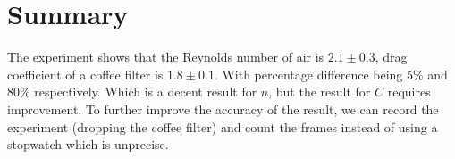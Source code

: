 \documentclass{article}
\begin{document}
\section{Summary}
The experiment shows that the Reynolds number of air is $2.1\pm 0.3$, drag coefficient of a coffee filter is $1.8\pm 0.1$. With percentage difference being 5\% and 80\% respectively. Which is a decent result for $n$, but the result for $C$ requires improvement. To further improve the accuracy of the result, we can record the experiment (dropping the coffee filter) and count the frames instead of using a stopwatch which is unprecise. 
\end{document}
